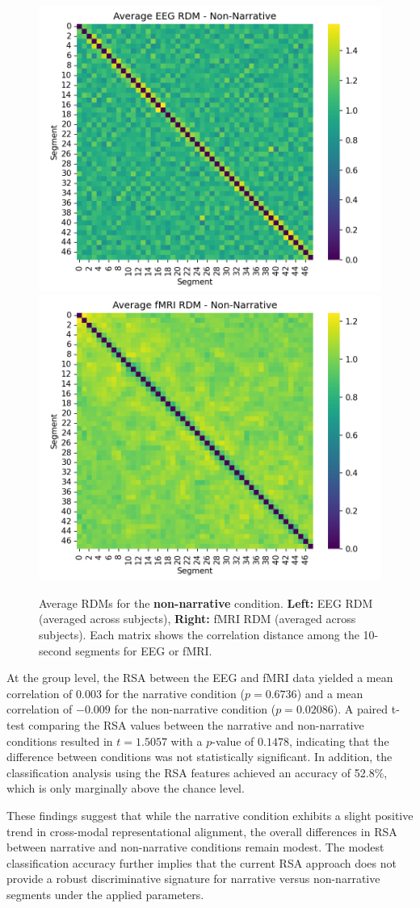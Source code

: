 \documentclass[stu,12pt,floatsintext]{apa7}
\begin{document}
\begin{figure}[ht!]
\centering
\includegraphics[width=0.45\linewidth]{Results/Plots/Avg_EEG_RDM_non_narr.png}
\hfill
\includegraphics[width=0.45\linewidth]{Results/Plots/Avg_fMRI_RDM_non_narr.png}
\caption{Average RDMs for the \textbf{non-narrative} condition. \textbf{Left:} EEG RDM (averaged across subjects), \textbf{Right:} fMRI RDM (averaged across subjects). Each matrix shows the correlation distance among the 10-second segments for EEG or fMRI.}
\label{fig:rdm_non_narr}
\end{figure}

At the group level, the RSA between the EEG and fMRI data yielded a mean correlation of 0.003 for the narrative condition ($p=0.6736$) and a mean correlation of $-0.009$ for the non-narrative condition ($p=0.02086$). A paired t-test comparing the RSA values between the narrative and non-narrative conditions resulted in $t=1.5057$ with a $p$-value of $0.1478$, indicating that the difference between conditions was not statistically significant. In addition, the classification analysis using the RSA features achieved an accuracy of 52.8\%, which is only marginally above the chance level.

These findings suggest that while the narrative condition exhibits a slight positive trend in cross-modal representational alignment, the overall differences in RSA between narrative and non-narrative conditions remain modest. The modest classification accuracy further implies that the current RSA approach does not provide a robust discriminative signature for narrative versus non-narrative segments under the applied parameters.
\end{document}
